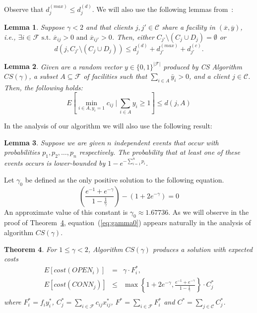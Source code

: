 \documentclass[11pt]{article}
\newtheorem{theorem}{Theorem}[section]
\newtheorem{lemma}[theorem]{Lemma}
\begin{document}
Observe that $d^{(max)}_j \leq d^{(d)}_j$.
We will also use the following lemmas from~\cite{byrka:2212}: 

\begin{lemma} \label{lem:main-lemma}
Suppose $\gamma < 2$ and that clients $j,j' \in \mathcal{C}$ share a facility in $(\overline{x},\overline{y})$, 
i.e., $\exists i \in \mathcal{F} \mbox{ s.t. } \overline{x}_{ij} > 0 \mbox{ and }
\overline{x}_{ij'} > 0 $. Then, either $C_{j'} \setminus
(C_j \cup D_j ) = \emptyset $ or
\[
 d(j,C_{j'} \setminus (C_j \cup D_j )) \leq
 d_{j}^{(d)} + d_{j'}^{(max)} + d_{j'}^{(c)}.
\]
\end{lemma}

\begin{lemma} \label{exp_distance_lemma}
 Given are a random vector $y \in \{0,1\}^{|\mathcal{F}|}$ produced by CS Algorithm
 $CS(\gamma)$, a subset $A\subseteq \mathcal{F}$ of facilities such that $\sum_{i\in A}\bar{y}_i>0$,
 and a client $j\in\mathcal{C}$. Then, the following holds:
\[
 E\left[\min_{i\in A, y_i=1}c_{ij} \ | \ \sum_{i\in A} y_i \geq 1\right] \leq d(j,A)
\]
\end{lemma}

In the analysis of our algorithm we will also use the following result:
\begin{lemma} \label{probability_lemma}
Suppose we are given $n$ independent events that occur with probabilities $p_1, p_2, \ldots, p_n$ respectively.
The probability that at least one of these events occurs is lower-bounded by
$1 - e^{-\sum_{i=1}^n p_i}$.
\end{lemma}

Let $\gamma_0$ be defined as the only positive solution to the following equation.
\begin{equation} \label{eq:gamma0}
\left( \frac{e^{-1} + e^{-\gamma}}{1 - \frac{1}{\gamma}} \right) -  \left(1 + 2e^{-\gamma} \right) = 0 
\end{equation}
An approximate value of this constant is $\gamma_0 \approx 1.67736$.
As we will observe in the proof of Theorem~\ref{thm:main-theorem},
equation~(\ref{eq:gamma0}) appears naturally in the analysis of algorithm $CS(\gamma)$.

\begin{theorem} \label{thm:main-theorem}
For $1 \leq \gamma < 2$, Algorithm $CS(\gamma)$ produces a solution with expected costs
\begin{eqnarray*}
E[cost(OPEN_i)] & = &\gamma \cdot F^*_i, \\
E[cost(CONN_j)] & \leq & \max\left\{1 + 2e^{-\gamma}, \frac{e^{-1}+e^{-\gamma}}{1 - \frac{1}{\gamma}}\right\} \cdot C^*_j\\  
\end{eqnarray*}
where $F^*_i = f_i y^*_i$, $C^*_j = \sum_{i \in \mathcal{F}}{c_{ij} x^*_{ij}}$, 
$F^* = \sum_{i \in \mathcal{F}}{F^*_i}$ and $C^* = \sum_{j \in \mathcal{C}}{C^*_j}$.
\end{theorem}
\end{document}
